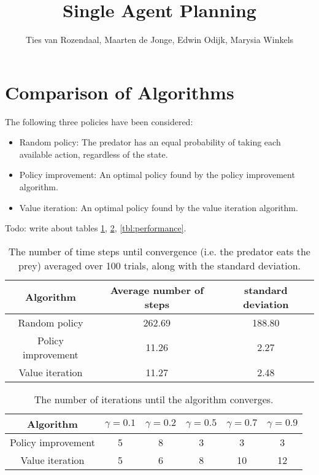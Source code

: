 \documentclass[a4paper, 12pt]{article}
\begin{document}
\title{Single Agent Planning}
\author{Ties van Rozendaal, Maarten de Jonge, Edwin Odijk, Marysia Winkels}
\maketitle

\section*{Comparison of Algorithms}
The following three policies have been considered:
\begin{itemize}
	\item Random policy: The predator has an equal probability of taking each
		available action, regardless of the state.
	\item Policy improvement: An optimal policy found by the policy improvement
		algorithm.
	\item Value iteration: An optimal policy found by the value iteration
		algorithm.
\end{itemize}

Todo: write about tables \ref{tbl:sim_convergence}, \ref{tbl:algo_convergence},
\ref{tbl:performance}.

\begin{table}[htb]
	\begin{tabular}{|c|c|c|}
		\hline
		Algorithm & Average number of steps & standard deviation \\
		\hline
		Random policy & 262.69 & 188.80 \\
		Policy improvement & 11.26 & 2.27 \\
		Value iteration & 11.27 & 2.48 \\
		\hline
	\end{tabular}
	\caption{The number of time steps until convergence (i.e. the predator eats
		the prey) averaged over 100 trials, along with the standard deviation.}
	\label{tbl:sim_convergence}
\end{table}

\begin{table}[htb]
	\begin{tabular}{|c|c|c|c|c|c|}
		\hline
		Algorithm & $\gamma = 0.1$ & $\gamma = 0.2$ & $\gamma = 0.5$ & $\gamma =
		0.7$ & $\gamma = 0.9$ \\
		\hline
		Policy improvement & 5 & 8 & 3 & 3 & 3 \\
		Value iteration & 5 & 6 & 8 & 10 & 12 \\
		\hline
	\end{tabular}
	\caption{The number of iterations until the algorithm converges.}
	\label{tbl:algo_convergence}
\end{table}
\end{document}
